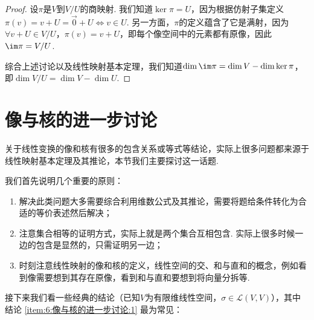 \begin{proof}
    设$\pi$是$V$到$V/U$的商映射. 我们知道$\ker\pi=U$，因为根据仿射子集定义$\pi(v)=v+U=\vec{0}+U\iff v\in U$. 另一方面，$\pi$的定义蕴含了它是满射，因为$\forall v+U\in V/U$，$\pi(v)=v+U$，即每个像空间中的元素都有原像，因此$\im\pi=V/U$.

    综合上述讨论以及线性映射基本定理，我们知道$\dim\im\pi=\dim V-\dim\ker\pi$，即$\dim V/U=\dim V-\dim U$.
\end{proof}

\section{像与核的进一步讨论} \label{sec:像与核的进一步讨论}

关于线性变换的像和核有很多的包含关系或等式等结论，实际上很多问题都来源于线性映射基本定理及其推论，本节我们主要探讨这一话题.

我们首先说明几个重要的原则：
\begin{enumerate}
    \item 解决此类问题大多需要综合利用维数公式及其推论，需要将题给条件转化为合适的等价表述然后解决；

    \item 注意集合相等的证明方式，实际上就是两个集合互相包含. 实际上很多时候一边的包含是显然的，只需证明另一边；

    \item 时刻注意线性映射的像和核的定义，线性空间的交、和与直和的概念，例如看到像需要想到其存在原像，看到和与直和要想到将向量分拆等.
\end{enumerate}

接下来我们看一些经典的结论（已知$V$为有限维线性空间，$\sigma\in \mathcal{L}(V,V)$），其中结论 \ref*{item:6:像与核的进一步讨论:1} 最为常见：

